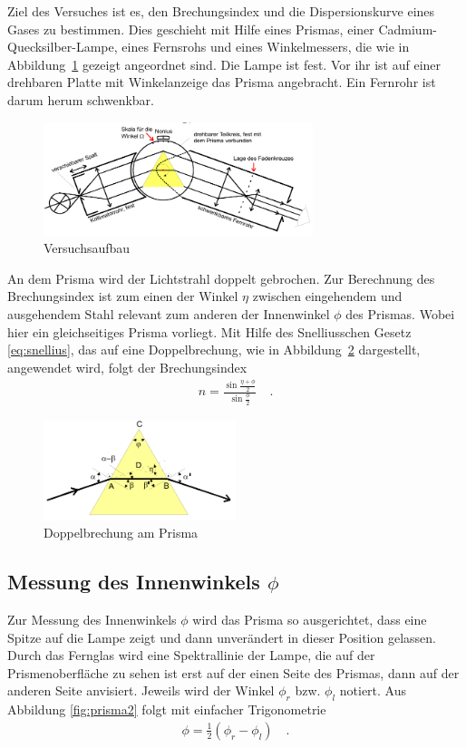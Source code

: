 Ziel des Versuches ist es, den Brechungsindex und die Dispersionskurve eines Gases zu bestimmen.
Dies geschieht mit Hilfe eines Prismas, einer Cadmium-Quecksilber-Lampe, eines Fernsrohs und eines Winkelmessers, die wie in Abbildung~\ref{fig:aufbau} gezeigt angeordnet sind. Die Lampe ist fest. Vor ihr ist auf einer drehbaren Platte mit Winkelanzeige das Prisma angebracht. Ein Fernrohr ist darum herum schwenkbar. \\

\begin{figure}[h!]
	\centering
	\includegraphics[width=0.7\textwidth]{Aufbau.png}
	\caption{Versuchsaufbau}
	\label{fig:aufbau}
\end{figure}

An dem Prisma wird der Lichtstrahl doppelt gebrochen. Zur Berechnung des Brechungsindex ist zum einen der Winkel  $\eta$ zwischen eingehendem und ausgehendem Stahl relevant zum anderen der Innenwinkel $\phi$ des Prismas. Wobei hier ein gleichseitiges Prisma vorliegt. Mit Hilfe des Snelliusschen Gesetz \eqref{eq:snellius}, das auf eine Doppelbrechung, wie in Abbildung~\ref{fig:prisma1} dargestellt, angewendet wird, folgt der Brechungsindex
\begin{align}
	n=\frac{\sin\frac{\eta + \phi}{2}}{\sin\frac{\phi}{2}} \quad .
\end{align}

\begin{figure}[h!]
	\centering
	\includegraphics[width=0.5\textwidth]{Prisma1.png}
	\caption{Doppelbrechung am Prisma}
	\label{fig:prisma1}
\end{figure}

\clearpage

\subsection{Messung des Innenwinkels $\phi$}
Zur Messung des Innenwinkels $\phi$ wird das Prisma so ausgerichtet, dass eine Spitze auf die Lampe zeigt und dann unverändert in dieser Position gelassen. Durch das Fernglas wird eine Spektrallinie der Lampe, die auf der Prismenoberfläche zu sehen ist erst auf der einen Seite des Prismas, dann auf der anderen Seite anvisiert. Jeweils wird der Winkel $\phi_r$ bzw. $\phi_l$ notiert. Aus Abbildung \ref{fig:prisma2} folgt mit einfacher Trigonometrie
\begin{align}
	\phi = \frac{1}{2} (\phi_r - \phi_l) \quad.
\end{align}

